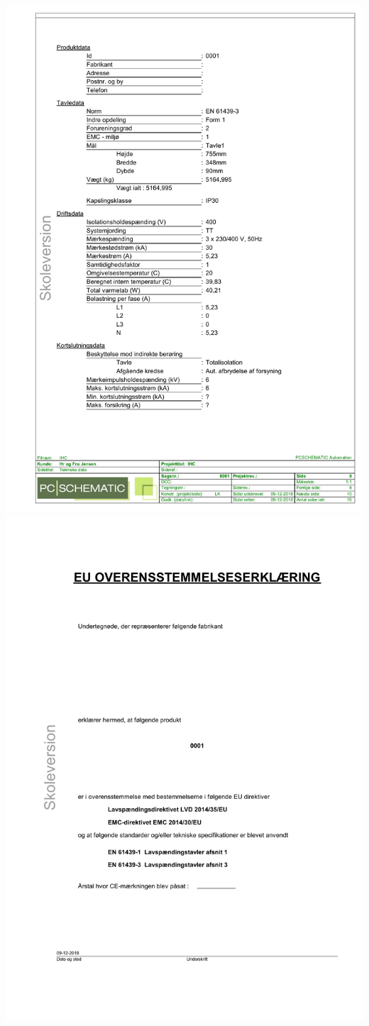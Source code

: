 \includegraphics[scale=0.72]{appendix/IHC_side_12.pdf}
\newpage
\includegraphics[scale=0.72]{appendix/IHC_side_13.pdf}